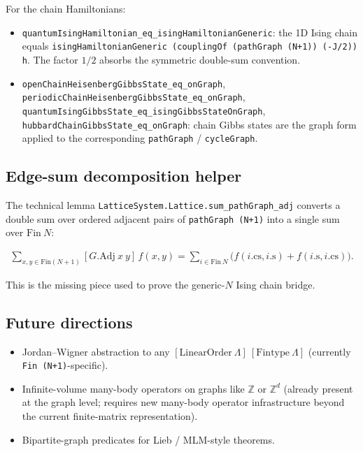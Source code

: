 \documentclass[a4paper,11pt]{article}
\begin{document}
For the chain Hamiltonians:

\begin{itemize}
  \item \texttt{quantumIsingHamiltonian\_eq\_isingHamiltonianGeneric}:
    the 1D Ising chain equals
    \texttt{isingHamiltonianGeneric (couplingOf (pathGraph (N+1)) (-J/2)) h}.
    The factor $1/2$ absorbs the symmetric double-sum convention.
  \item \texttt{openChainHeisenbergGibbsState\_eq\_onGraph},
    \texttt{periodicChainHeisenbergGibbsState\_eq\_onGraph},
    \texttt{quantumIsingGibbsState\_eq\_isingGibbsStateOnGraph},
    \texttt{hubbardChainGibbsState\_eq\_onGraph}:
    chain Gibbs states are the graph form applied to the corresponding
    \texttt{pathGraph} / \texttt{cycleGraph}.
\end{itemize}

\subsection{Edge-sum decomposition helper}

The technical lemma
\texttt{LatticeSystem.Lattice.sum\_pathGraph\_adj} converts a
double sum over ordered adjacent pairs of \texttt{pathGraph (N+1)}
into a single sum over $\mathrm{Fin}~N$:

\begin{align*}
  \sum_{x,y \in \mathrm{Fin}(N+1)} [G.\mathrm{Adj}~x~y]\, f(x,y)
  = \sum_{i \in \mathrm{Fin}~N} \bigl(f(i.\mathrm{cs}, i.\mathrm{s})
    + f(i.\mathrm{s}, i.\mathrm{cs})\bigr).
\end{align*}

This is the missing piece used to prove the generic-$N$ Ising
chain bridge.

\subsection{Future directions}

\begin{itemize}
  \item Jordan--Wigner abstraction to any
    $[\mathrm{LinearOrder}~\Lambda]~[\mathrm{Fintype}~\Lambda]$
    (currently \texttt{Fin (N+1)}-specific).
  \item Infinite-volume many-body operators on graphs like
    $\mathbb{Z}$ or $\mathbb{Z}^d$ (already present at the graph
    level; requires new many-body operator infrastructure
    beyond the current finite-matrix representation).
  \item Bipartite-graph predicates for Lieb / MLM-style theorems.
\end{itemize}
\end{document}
